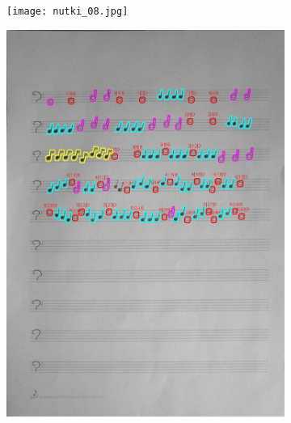 \documentclass[11pt]{article}
\begin{document}
\begin{figure}[H]
    \centering
    \begin{subfigure}{.5\textwidth}
        \centering
        \graphicspath{ {Resources/} }
        \texttt{[image: nutki\_08.jpg]}
        \label{fig:sub1}
    \end{subfigure}%
    \begin{subfigure}{.5\textwidth}
        \centering
        \graphicspath{ {blobs/} }
        \includegraphics[width=\linewidth]{8_cnts.jpg}
        \label{fig:sub2}
    \end{subfigure}
    \label{fig:test}
\end{figure}
\end{document}
